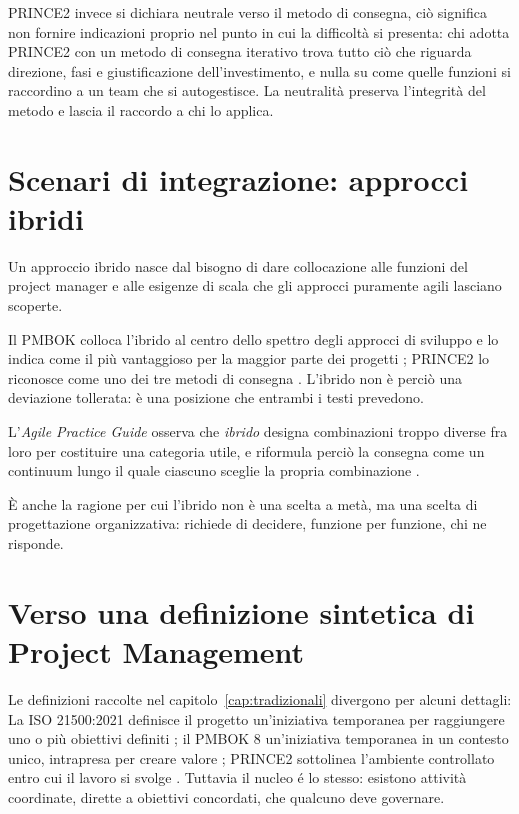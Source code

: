 PRINCE2 invece si dichiara neutrale verso il metodo di consegna, ci\`o significa
non fornire indicazioni proprio
nel punto in cui la difficolt\`a si presenta: chi adotta PRINCE2 con un metodo
di consegna iterativo trova tutto ci\`o che riguarda
direzione, fasi e giustificazione dell'investimento, e nulla su come quelle
funzioni si raccordino a un team che si autogestisce. La neutralit\`a preserva
l'integrit\`a del metodo e lascia il raccordo a chi lo applica.



\section{Scenari di integrazione: approcci ibridi}

Un approccio ibrido nasce dal bisogno di dare collocazione alle funzioni del
project manager e alle esigenze di scala che gli approcci puramente agili lasciano
scoperte.

Il PMBOK colloca l'ibrido al
centro dello spettro degli approcci di sviluppo e lo indica come il pi\`u
vantaggioso per la maggior parte dei progetti \cite{pmbok8}; PRINCE2 lo
riconosce come uno dei tre metodi di consegna \cite{prince27}. L'ibrido non \`e
perci\`o una deviazione tollerata: \`e una posizione che entrambi i testi
prevedono.

L'\emph{Agile Practice Guide}
osserva che \emph{ibrido} designa combinazioni troppo diverse fra loro per
costituire una categoria utile, e riformula perci\`o la consegna come un
continuum lungo il quale ciascuno sceglie la propria combinazione
\cite{agilepracticeguide2}.

\`E anche la ragione per cui l'ibrido non \`e una scelta a met\`a, ma una scelta
di progettazione organizzativa: richiede di decidere, funzione per funzione,
chi ne risponde.


\section{Verso una definizione sintetica di Project Management}

Le definizioni raccolte nel capitolo~\ref{cap:tradizionali} divergono
per alcuni dettagli: La ISO 21500:2021 definisce il progetto un'iniziativa temporanea
per raggiungere uno o pi\`u obiettivi definiti \cite{iso21500-2021}; il PMBOK 8
un'iniziativa temporanea in un contesto unico, intrapresa per creare valore
\cite{pmbok8}; PRINCE2 sottolinea l'ambiente controllato entro cui il lavoro si
svolge \cite{prince27}. Tuttavia il nucleo \'e lo stesso: esistono attivit\`a
coordinate, dirette a obiettivi concordati, che qualcuno deve governare.

